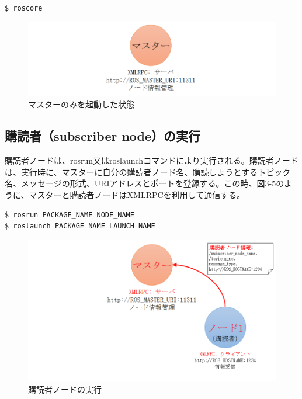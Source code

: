 \begin{lstlisting}[language=ROS]
$ roscore
\end{lstlisting}

\begin{figure}[h]
  \centering
  \includegraphics[width=\columnwidth]{pictures/chapter3/pic_03_04.png}
  \caption{マスターのみを起動した状態}
\end{figure}

\subsection{購読者（subscriber node）の実行}
購読者ノードは、rosrun又はroslaunchコマンドにより実行される。購読者ノードは、実行時に、マスターに自分の購読者ノード名、購読しようとするトピック名、メッセージの形式、URIアドレスとポートを登録する。この時、図3-5のように、マスターと購読者ノードはXMLRPCを利用して通信する。

\begin{lstlisting}[language=ROS]
$ rosrun PACKAGE_NAME NODE_NAME
$ roslaunch PACKAGE_NAME LAUNCH_NAME
\end{lstlisting}

\begin{figure}[h]
  \centering
  \includegraphics[width=\columnwidth]{pictures/chapter3/pic_03_05.png}
  \caption{購読者ノードの実行}
\end{figure}

